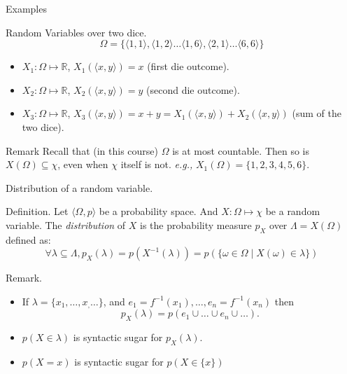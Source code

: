 \documentclass{beamer}
\begin{document}
\begin{frame}{Examples}
  \begin{exampleblock}{Random Variables over two dice.}
    \[\Omega = \{\langle 1,1 \rangle, \langle 1,2 \rangle \dots \langle 1,6 \rangle, \langle 2,1 \rangle \dots \langle 6,6 \rangle\}\]
    \begin{itemize}
    \item $X_1: \Omega \mapsto \mathbb{R}$, $X_1(\langle x,y\rangle) = x$ (first die outcome).
    \item $X_2: \Omega \mapsto \mathbb{R}$, $X_2(\langle x,y \rangle) = y$ (second die outcome).
    \item $X_3: \Omega \mapsto \mathbb{R}$, $X_3(\langle x,y \rangle) = x + y = X_1(\langle x,y\rangle) + X_2(\langle x,y \rangle)$ (sum of the two dice).
    \end{itemize}
  \end{exampleblock}

  \begin{block}{Remark}
    Recall that (in this course)  $\Omega$ is at most countable. Then so is $X(\Omega) \subseteq \chi$, even when $\chi$ itself is not. \emph{e.g.,} $X_1(\Omega) = \{1,2,3,4,5,6\}$.
  \end{block}
  
\end{frame}

\begin{frame}{Distribution of a random variable.}
  \begin{block}{Definition.}
    Let $\langle \Omega, p \rangle$ be a probability space. And $X: \Omega \mapsto \chi$ be a random variable. The \emph{distribution} of $X$ is the probability measure $p_X$ over $\Lambda = X(\Omega)$ defined as:
    \[\forall \lambda \subseteq \Lambda,  p_X(\lambda) = p(X^{-1}(\lambda)) = p(\{\omega \in \Omega \mid X(\omega) \in \lambda\})\]
  \end{block}

  \begin{block}{Remark.}
    \begin{itemize}
    \item    If $\lambda = \{x_1, \dots, x_, \dots \}$, and $e_1 = f^{-1}(x_1), \dots, e_n = f^{-1}(x_n)$ then
      \[p_X(\lambda) = p(e_1 \cup \dots \cup e_n \cup \dots).\]
    \item $p(X \in \lambda)$ is syntactic sugar for  $p_X(\lambda)$.
    \item $p(X = x)$ is syntactic sugar for $p(X \in \{x\})$
    \end{itemize}
  \end{block} 
\end{frame}
\end{document}
